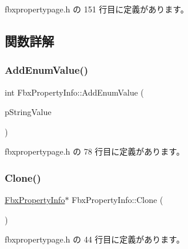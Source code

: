  fbxpropertypage.\+h の 151 行目に定義があります。



\subsection{関数詳解}
\mbox{\label{class_fbx_property_info_a47286c778cd759d4c1e8d37f7a4ca785}} 
\subsubsection{\texorpdfstring{Add\+Enum\+Value()}{AddEnumValue()}}
{\footnotesize\ttfamily int Fbx\+Property\+Info\+::\+Add\+Enum\+Value (\begin{DoxyParamCaption}\item[{const char $\ast$}]{p\+String\+Value }\end{DoxyParamCaption})\hspace{0.3cm}{\ttfamily [inline]}}



 fbxpropertypage.\+h の 78 行目に定義があります。

\mbox{\label{class_fbx_property_info_a2eacb232583e5bcb8f4abc5f6689b3b7}} 
\subsubsection{\texorpdfstring{Clone()}{Clone()}}
{\footnotesize\ttfamily \hyperlink{class_fbx_property_info}{Fbx\+Property\+Info}$\ast$ Fbx\+Property\+Info\+::\+Clone (\begin{DoxyParamCaption}\item[{\hyperlink{class_fbx_property_page}{Fbx\+Property\+Page} $\ast$}]{ }\end{DoxyParamCaption})\hspace{0.3cm}{\ttfamily [inline]}}



 fbxpropertypage.\+h の 44 行目に定義があります。

\mbox{\label{class_fbx_property_info_a17f842fb2c82eb02053ea4b7e2dacc6f}} 
